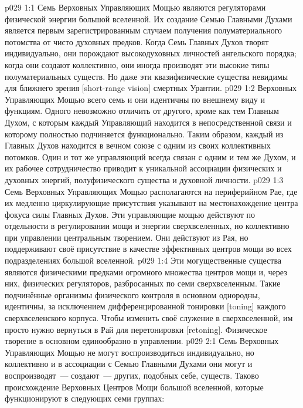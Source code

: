 \vs p029 1:1 Семь Верховных Управляющих Мощью являются регуляторами физической энергии большой вселенной. Их создание Семью Главными Духами является первым зарегистрированным случаем получения полуматериального потомства от чисто духовных предков. Когда Семь Главных Духов творят индивидуально, они порождают высокодуховных личностей ангельского порядка; когда они создают коллективно, они иногда производят эти высокие типы полуматериальных существ. Но даже эти квазифизические существа невидимы для ближнего зрения [short\hyp{}range vision] смертных Урантии.
\vs p029 1:2 Верховных Управляющих Мощью всего семь и они идентичны по внешнему виду и функциям. Одного невозможно отличить от другого, кроме как тем Главным Духом, с которым каждый Управляющий находится в непосредственной связи и которому полностью подчиняется функционально. Таким образом, каждый из Главных Духов находится в вечном союзе с одним из своих коллективных потомков. Один и тот же управляющий всегда связан с одним и тем же Духом, и их рабочее сотрудничество приводит к уникальной ассоциации физических и духовных энергий, полуфизического существа и духовной личности.
\vs p029 1:3 Семь Верховных Управляющих Мощью располагаются на периферийном Рае, где их медленно циркулирующие присутствия указывают на местонахождение центра фокуса силы Главных Духов. Эти управляющие мощью действуют по отдельности в регулировании мощи и энергии сверхвселенных, но коллективно при управлении центральным творением. Они действуют из Рая, но поддерживают своё присутствие в качестве эффективных центров мощи во всех подразделениях большой вселенной.
\vs p029 1:4 Эти могущественные существа являются физическими предками огромного множества центров мощи и, через них, физических регуляторов, разбросанных по семи сверхвселенным. Такие подчинённые организмы физического контроля в основном однородны, идентичны, за исключением дифференцированной тонировки [toning] каждого сверхвселенского корпуса. Чтобы изменить своё служение в сверхвселенной, им просто нужно вернуться в Рай для перетонировки [retoning]. Физическое творение в основном единообразно в управлении.
\vs p029 2:1 Семь Верховных Управляющих Мощью не могут воспроизводиться индивидуально, но коллективно и в ассоциации с Семью Главными Духами они могут и воспроизводят~--- создают~--- других, подобных себе, существ. Таково происхождение Верховных Центров Мощи большой вселенной, которые функционируют в следующих семи группах:
